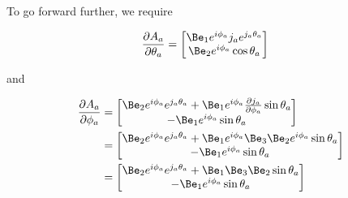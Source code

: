 To go forward further, we require

\begin{align*}
\PD{\theta_a}{A_a} &=
\begin{bmatrix}
\Be_1 e^{i \phi_a} j_a e^{j_a \theta_a} \\
\Be_2 e^{i \phi_a} \cos\theta_a 
\end{bmatrix} 
\end{align*}

and

\begin{align*}
\PD{\phi_a}{A_a} 
&=
\begin{bmatrix}
\Be_2 e^{i \phi_a} e^{j_a \theta_a} 
+\Be_1 e^{i \phi_a} \PD{\phi_a}{j_a} \sin\theta_a
\\
-\Be_1 e^{i \phi_a} \sin\theta_a 
\end{bmatrix} \\
&=
\begin{bmatrix}
\Be_2 e^{i \phi_a} e^{j_a \theta_a} 
+\Be_1 e^{i \phi_a} \Be_3 \Be_2 e^{i\phi_a} \sin\theta_a
\\
-\Be_1 e^{i \phi_a} \sin\theta_a 
\end{bmatrix} \\
&=
\begin{bmatrix}
\Be_2 e^{i \phi_a} e^{j_a \theta_a} 
+\Be_1 \Be_3 \Be_2 \sin\theta_a
\\
-\Be_1 e^{i \phi_a} \sin\theta_a 
\end{bmatrix} \\
\end{align*}

\EndNoBibArticle

